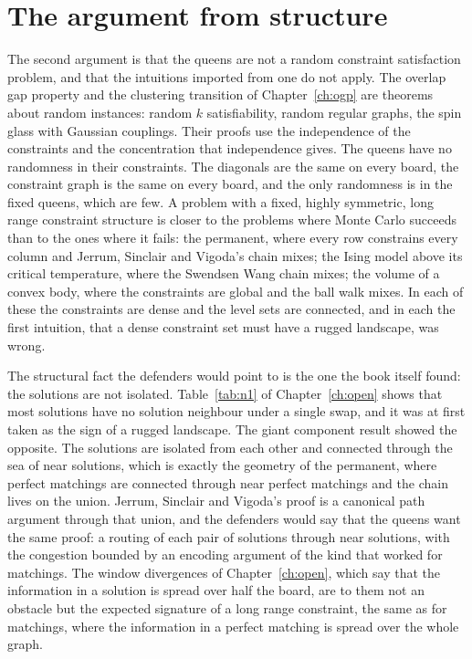 \section{The argument from structure}

The second argument is that the queens are not a random constraint satisfaction problem, and that the intuitions imported from one do not apply. The overlap gap property and the clustering transition of Chapter~\ref{ch:ogp} are theorems about random instances: random $k$ satisfiability, random regular graphs, the spin glass with Gaussian couplings. Their proofs use the independence of the constraints and the concentration that independence gives. The queens have no randomness in their constraints. The diagonals are the same on every board, the constraint graph is the same on every board, and the only randomness is in the fixed queens, which are few. A problem with a fixed, highly symmetric, long range constraint structure is closer to the problems where Monte Carlo succeeds than to the ones where it fails: the permanent, where every row constrains every column and Jerrum, Sinclair and Vigoda's chain mixes; the Ising model above its critical temperature, where the Swendsen Wang chain mixes; the volume of a convex body, where the constraints are global and the ball walk mixes. In each of these the constraints are dense and the level sets are connected, and in each the first intuition, that a dense constraint set must have a rugged landscape, was wrong.

The structural fact the defenders would point to is the one the book itself found: the solutions are not isolated. Table~\ref{tab:n1} of Chapter~\ref{ch:open} shows that most solutions have no solution neighbour under a single swap, and it was at first taken as the sign of a rugged landscape. The giant component result showed the opposite. The solutions are isolated from each other and connected through the sea of near solutions, which is exactly the geometry of the permanent, where perfect matchings are connected through near perfect matchings and the chain lives on the union. Jerrum, Sinclair and Vigoda's proof is a canonical path argument through that union, and the defenders would say that the queens want the same proof: a routing of each pair of solutions through near solutions, with the congestion bounded by an encoding argument of the kind that worked for matchings. The window divergences of Chapter~\ref{ch:open}, which say that the information in a solution is spread over half the board, are to them not an obstacle but the expected signature of a long range constraint, the same as for matchings, where the information in a perfect matching is spread over the whole graph.


